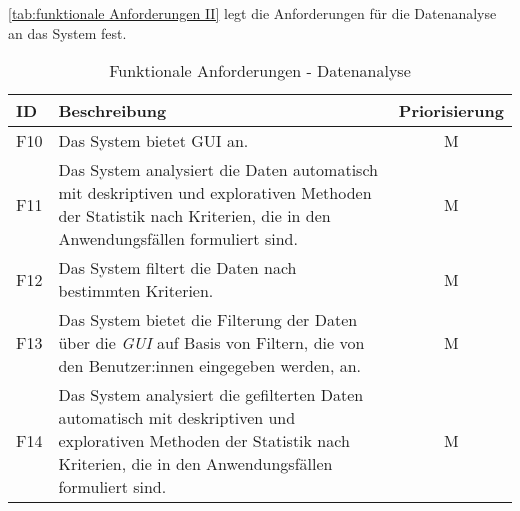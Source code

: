 \autoref{tab:funktionale Anforderungen II} legt die Anforderungen  für die Datenanalyse an das System fest.

\begingroup
\setlength{\tabcolsep}{10pt} %
\renewcommand{\arraystretch}{1.25} 
\begin{table}[h]
    \centering
    \begin{adjustbox}{max width=\textwidth}
    \begin{tabular}{lp{15cm}c}
       \toprule
       \textbf{ID}          & \textbf{Beschreibung} &\textbf{Priorisierung}\\
       \midrule
        F10                              &Das System bietet \acrfull{GUI} an.  & M\\
        F11                              &Das System analysiert die Daten automatisch mit deskriptiven und explorativen Methoden der Statistik nach Kriterien, die in den Anwendungsfällen formuliert sind.  & M\\
        F12                              &Das System filtert die Daten nach bestimmten Kriterien.  & M\\ %
        F13                              &Das System bietet die Filterung der Daten über die \textit{\acrshort{GUI}} auf Basis von Filtern, die von den Benutzer:innen eingegeben werden, an.  & M\\
        F14                              &Das System analysiert die gefilterten Daten automatisch mit deskriptiven und explorativen Methoden der Statistik nach Kriterien, die in den Anwendungsfällen formuliert sind. & M\\                             
        \bottomrule
    \end{tabular}
    \end{adjustbox}
    \caption{%
        Funktionale Anforderungen - Datenanalyse
    }
    \label{tab:funktionale Anforderungen II}
    \end{table}
\endgroup


